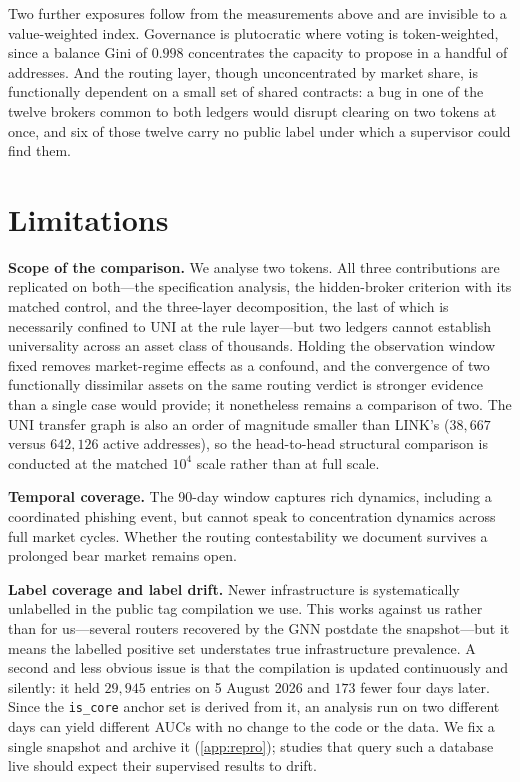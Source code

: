 \documentclass[final,5p,times]{elsarticle}
\begin{document}
Two further exposures follow from the measurements above and are invisible to
a value-weighted index. Governance is plutocratic where voting is
token-weighted, since a balance Gini of $0.998$ concentrates the capacity to
propose in a handful of addresses. And the routing layer, though
unconcentrated by market share, is functionally dependent on a small set of
shared contracts: a bug in one of the twelve brokers common to both ledgers
would disrupt clearing on two tokens at once, and six of those twelve carry
no public label under which a supervisor could find them.

\section{Limitations}
\label{sec:limitations}

\textbf{Scope of the comparison.} We analyse two tokens. All three
contributions are replicated on both---the specification analysis, the
hidden-broker criterion with its matched control, and the three-layer
decomposition, the last of which is necessarily confined to UNI at the rule
layer---but two ledgers cannot
establish universality across an asset class of thousands. Holding the
observation window fixed removes market-regime effects as a confound, and
the convergence of two functionally dissimilar assets on the same routing
verdict is stronger evidence than a single case would provide; it
nonetheless remains a comparison of two. The UNI
transfer graph is also an order of magnitude smaller than LINK's
($38{,}667$ versus $642{,}126$ active addresses), so the head-to-head
structural comparison is conducted at the matched $10^4$ scale rather than
at full scale.

\textbf{Temporal coverage.} The 90-day window captures rich dynamics,
including a coordinated phishing event, but cannot speak to concentration
dynamics across full market cycles. Whether the routing contestability we
document survives a prolonged bear market remains open.

\textbf{Label coverage and label drift.} Newer infrastructure is
systematically unlabelled in the public tag compilation we use. This works
against us rather than for us---several routers recovered by the GNN
postdate the snapshot---but it means the labelled positive set understates
true infrastructure prevalence. A second and less obvious issue is that the
compilation is updated continuously and silently: it held $29{,}945$ entries
on 5 August 2026 and $173$ fewer four days later. Since the \texttt{is\_core}
anchor set is derived from it, an analysis run on two different days can
yield different AUCs with no change to the code or the data. We fix a single
snapshot and archive it (\ref{app:repro}); studies that query
such a database live should expect their supervised results to drift.
\end{document}
